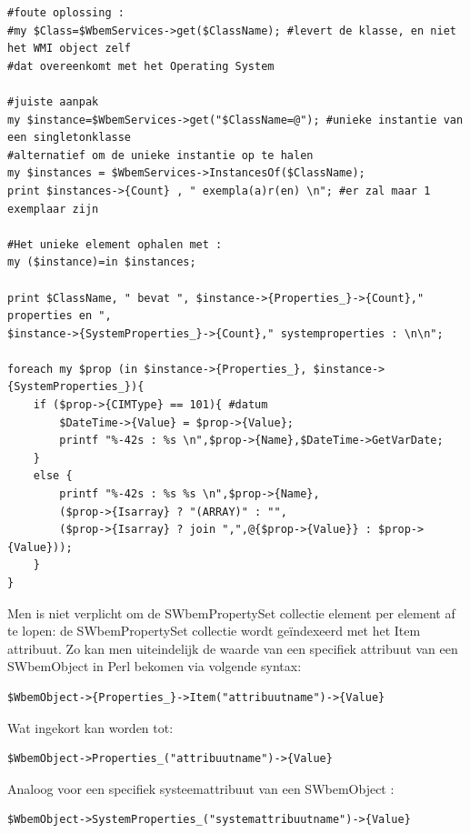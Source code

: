 \documentclass[11pt,a4paper]{report}
\begin{document}
\begin{enumerate}[resume]
\begin{lstlisting}
#foute oplossing :
#my $Class=$WbemServices->get($ClassName); #levert de klasse, en niet het WMI object zelf 
#dat overeenkomt met het Operating System

#juiste aanpak
my $instance=$WbemServices->get("$ClassName=@"); #unieke instantie van een singletonklasse
#alternatief om de unieke instantie op te halen
my $instances = $WbemServices->InstancesOf($ClassName);
print $instances->{Count} , " exempla(a)r(en) \n"; #er zal maar 1 exemplaar zijn

#Het unieke element ophalen met :
my ($instance)=in $instances; 

print $ClassName, " bevat ", $instance->{Properties_}->{Count}," properties en ", 
$instance->{SystemProperties_}->{Count}," systemproperties : \n\n";

foreach my $prop (in $instance->{Properties_}, $instance->{SystemProperties_}){
	if ($prop->{CIMType} == 101){ #datum
		$DateTime->{Value} = $prop->{Value};     
		printf "%-42s : %s \n",$prop->{Name},$DateTime->GetVarDate;
	}
	else {
		printf "%-42s : %s %s \n",$prop->{Name},
		($prop->{Isarray} ? "(ARRAY)" : "",
		($prop->{Isarray} ? join ",",@{$prop->{Value}} : $prop->{Value}));
	}
}
	\end{lstlisting}
\end{enumerate}
Men is niet verplicht om de SWbemPropertySet collectie element per element af te lopen: de SWbemPropertySet collectie wordt geïndexeerd met het Item attribuut. Zo kan men uiteindelijk de waarde van een specifiek attribuut van een SWbemObject in Perl bekomen via volgende syntax:
\begin{lstlisting}
$WbemObject->{Properties_}->Item("attribuutname")->{Value}
\end{lstlisting}
Wat ingekort kan worden tot:
\begin{lstlisting}
$WbemObject->Properties_("attribuutname")->{Value}
\end{lstlisting}
Analoog voor een specifiek systeemattribuut van een SWbemObject :
\begin{lstlisting}
$WbemObject->SystemProperties_("systemattribuutname")->{Value}
\end{lstlisting}
\end{document}
